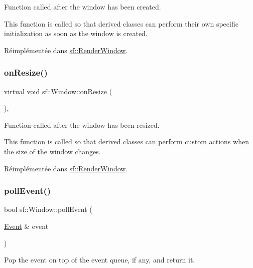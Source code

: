 Function called after the window has been created. 

This function is called so that derived classes can perform their own specific initialization as soon as the window is created. 

Réimplémentée dans \hyperlink{classsf_1_1RenderWindow_a5bef0040b0fa87bed9fbd459c980d53a}{sf\+::\+Render\+Window}.

\mbox{\label{classsf_1_1Window_a10f567a387da7b49f417f73321fcf64d}} 
\subsubsection{\texorpdfstring{on\+Resize()}{onResize()}}
{\footnotesize\ttfamily virtual void sf\+::\+Window\+::on\+Resize (\begin{DoxyParamCaption}{ }\end{DoxyParamCaption})\hspace{0.3cm}{\ttfamily [protected]}, {\ttfamily [virtual]}}



Function called after the window has been resized. 

This function is called so that derived classes can perform custom actions when the size of the window changes. 

Réimplémentée dans \hyperlink{classsf_1_1RenderWindow_a5c85fe482313562d33ffd24a194b6fef}{sf\+::\+Render\+Window}.

\mbox{\label{classsf_1_1Window_a338e996585faf82e93069858e3b531b7}} 
\subsubsection{\texorpdfstring{poll\+Event()}{pollEvent()}}
{\footnotesize\ttfamily bool sf\+::\+Window\+::poll\+Event (\begin{DoxyParamCaption}\item[{\hyperlink{classsf_1_1Event}{Event} \&}]{event }\end{DoxyParamCaption})}



Pop the event on top of the event queue, if any, and return it. 

